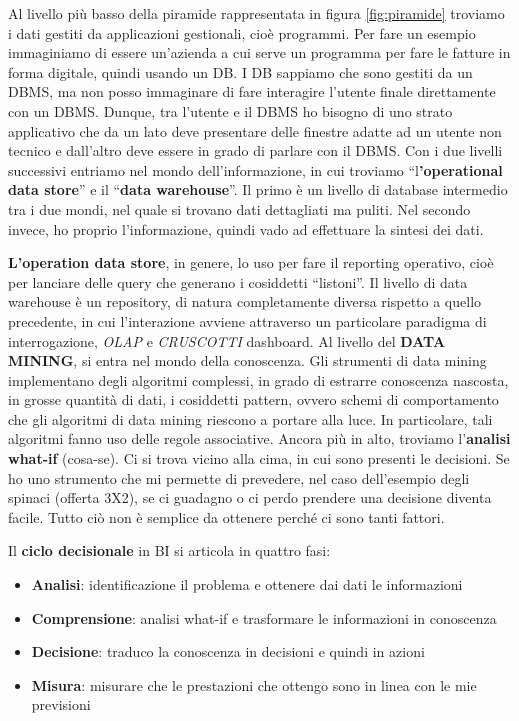 Al livello più basso della piramide rappresentata in figura \ref{fig:piramide} troviamo i dati gestiti da applicazioni gestionali, cioè programmi. Per fare un esempio immaginiamo di essere un’azienda a cui serve un programma per fare le fatture in forma digitale, quindi usando un DB. I DB sappiamo che sono gestiti da un DBMS, ma non posso immaginare di fare interagire l’utente finale direttamente con un DBMS. Dunque, tra l’utente e il DBMS ho bisogno di uno strato applicativo che da un lato deve presentare delle finestre adatte ad un utente non tecnico e dall’altro deve essere in grado di parlare con il DBMS. 
Con i due livelli successivi entriamo nel mondo dell’informazione, in cui troviamo “l\textbf{’operational data store}” e il “\textbf{data warehouse}”. Il primo è un livello di database intermedio tra i due mondi, nel quale si trovano  dati dettagliati ma puliti. Nel secondo invece, ho proprio l’informazione, quindi vado ad effettuare la sintesi dei dati.

\textbf{L’operation data store}, in genere, lo uso per fare il reporting operativo, cioè per lanciare delle query che generano i cosiddetti “listoni”. Il livello di data warehouse è un repository, di natura completamente diversa rispetto a quello precedente, in cui l’interazione avviene attraverso un particolare paradigma di interrogazione, \textit{OLAP} e \textit{CRUSCOTTI} dashboard. Al livello del \textbf{DATA MINING}, si entra nel mondo della conoscenza. Gli strumenti di data mining implementano degli algoritmi complessi, in grado di estrarre conoscenza nascosta, in grosse quantità di dati, i cosiddetti pattern, ovvero schemi di comportamento che gli algoritmi di data mining riescono a portare alla luce. In particolare, tali algoritmi fanno uso delle regole associative. Ancora più in alto, troviamo l’\textbf{analisi what-if} (cosa-se). Ci si trova vicino alla cima, in cui sono presenti le decisioni. Se ho uno strumento che mi permette di prevedere, nel caso dell’esempio degli spinaci (offerta 3X2), se ci guadagno o ci perdo prendere una decisione diventa facile. Tutto ciò non è semplice da ottenere perché ci sono tanti fattori. 

Il \textbf{ciclo decisionale} in BI si articola in quattro fasi:
\begin{itemize}
	\item 
	\textbf{Analisi}: identificazione il problema e ottenere dai dati le informazioni
	\item
	\textbf{Comprensione}: analisi what-if e trasformare le informazioni in conoscenza
	\item 
	\textbf{Decisione}: traduco la conoscenza in decisioni e quindi in azioni
	\item 
	\textbf{Misura}: misurare che le prestazioni che ottengo sono in linea con le mie previsioni
\end{itemize}

